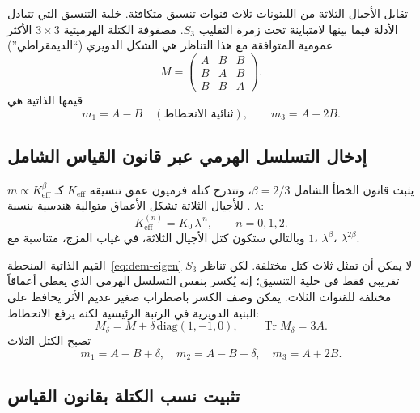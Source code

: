\documentclass[12pt,a4paper]{article}
\begin{document}
	تقابل الأجيال الثلاثة من اللبتونات ثلاث قنوات تنسيق متكافئة. خلية التنسيق التي تتبادل الأدلة فيما بينها لامتباينة تحت زمرة التقليب \(S_3\). مصفوفة الكتلة الهرميتية \(3\times3\) الأكثر عمومية المتوافقة مع هذا التناظر هي الشكل الدويري (``الديمقراطي'')
	\begin{equation}
		M = \begin{pmatrix}
			A & B & B \\
			B & A & B \\
			B & B & A
		\end{pmatrix}.
		\label{eq:democratic}
	\end{equation}
	قيمها الذاتية هي
	\begin{equation}
		m_1 = A - B \quad (\text{ثنائية الانحطاط}), \qquad
		m_3 = A + 2B .
		\label{eq:dem-eigen}
	\end{equation}
	
	\subsection{إدخال التسلسل الهرمي عبر قانون القياس الشامل}
	
	يثبت قانون الخطأ الشامل \(\beta = 2/3\)، وتتدرج كتلة فرميون عمق تنسيقه \(K_{\mathrm{eff}}\) كـ \(m \propto K_{\mathrm{eff}}^{\beta}\). للأجيال الثلاثة تشكل الأعماق متوالية هندسية بنسبة \(\lambda\):
	\[
	K_{\mathrm{eff}}^{(n)} = K_0 \, \lambda^{\,n}, \qquad n = 0,1,2 .
	\]
	وبالتالي ستكون كتل الأجيال الثلاثة، في غياب المزج، متناسبة مع \(1\)، \(\lambda^{\beta}\)، \(\lambda^{2\beta}\).
	
	القيم الذاتية المنحطة~\eqref{eq:dem-eigen} لا يمكن أن تمثل ثلاث كتل مختلفة. لكن تناظر \(S_3\) تقريبي فقط في خلية التنسيق؛ إنه يُكسر بنفس التسلسل الهرمي الذي يعطي أعماقاً مختلفة للقنوات الثلاث. يمكن وصف الكسر باضطراب صغير عديم الأثر يحافظ على البنية الدويرية في الرتبة الرئيسية لكنه يرفع الانحطاط:
	\begin{equation}
		M_\delta = M + \delta \,\mathrm{diag}(1,-1,0), \qquad \operatorname{Tr} M_\delta = 3A .
	\end{equation}
	تصبح الكتل الثلاث
	\begin{equation}
		m_1 = A - B + \delta, \quad
		m_2 = A - B - \delta, \quad
		m_3 = A + 2B .
		\label{eq:three-masses}
	\end{equation}
	
	\subsection{تثبيت نسب الكتلة بقانون القياس}
	
\end{document}
